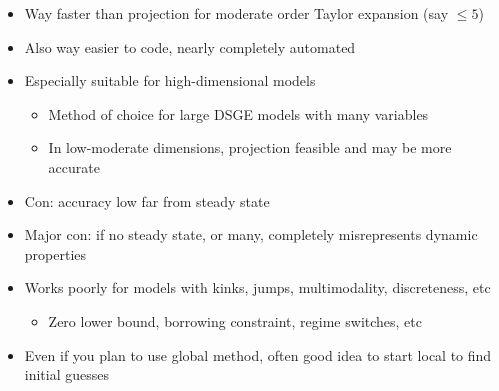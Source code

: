 \documentclass[bigger,handout]{beamer}
\begin{document}
\begin{frame}

\begin{itemize}
\item Way faster than projection for moderate order Taylor expansion (say $\leq 5$)
\item Also way easier to code, nearly completely automated
\item Especially suitable for high-dimensional models
\begin{itemize}
\item Method of choice for large DSGE models with many variables
\item In low-moderate dimensions, projection feasible and may be more accurate 
\end{itemize}
\item Con: accuracy low far from steady state
\item Major con: if no steady state, or many, completely misrepresents dynamic properties
\item Works poorly for models with kinks, jumps, multimodality, discreteness, etc
\begin{itemize}
\item Zero lower bound, borrowing constraint, regime switches, etc
\end{itemize}
\item Even if you plan to use global method, often good idea to start local to find initial guesses


\end{itemize}

\end{frame}%
\end{document}
